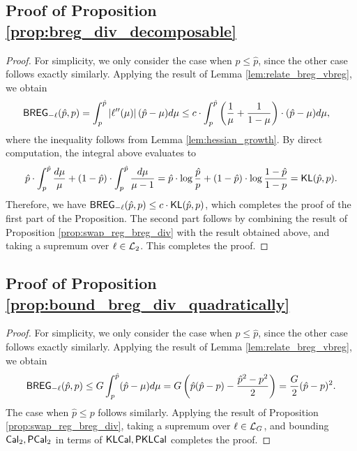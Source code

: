 \subsection{Proof of Proposition \ref{prop:breg_div_decomposable}}
\begin{proof}
    For simplicity, we only consider the case when $p \le \hat{p}$, since the other case follows exactly similarly. Applying the result of Lemma \ref{lem:relate_breg_vbreg}, we obtain \begin{align*}
        \mathsf{BREG}_{-\ell}(\hat{p}, p) &= \int_{p} ^ {\hat{p}} \left\lvert\ell''(\mu)\right\rvert (\hat{p} - \mu) d\mu \le c \cdot \int_{p} ^ {\hat{p}} \left( \frac{1}{\mu} + \frac{1}{1 - \mu} \right) \cdot (\hat{p} - \mu) d\mu,
    \end{align*}
    where the inequality follows from Lemma \ref{lem:hessian_growth}. By direct computation, the integral above evaluates to \begin{align*}
        \hat{p} \cdot \int_{p} ^ {\hat{p}} \frac{d\mu}{\mu} + (1 - \hat{p}) \cdot \int_{p} ^ {\hat{p}} \frac{d\mu}{\mu - 1} = \hat{p} \cdot \log \frac{\hat{p}}{p} + (1 - \hat{p}) \cdot \log \frac{1 - \hat{p}}{1 - p} = \mathsf{KL}(\hat{p}, p).
    \end{align*}
    Therefore, we have $\mathsf{BREG}_{-\ell}(\hat{p}, p) \le c \cdot \mathsf{KL}(\hat{p}, p)$, which completes the proof of the first part of the Proposition. The second part follows by combining the result of Proposition \ref{prop:swap_reg_breg_div} with the result obtained above, and taking a supremum over $\ell \in \mathcal{L}_{2}$. This completes the proof.
\end{proof}

\subsection{Proof of Proposition \ref{prop:bound_breg_div_quadratically}}

\begin{proof}
    For simplicity, we only consider the case when $p \le \hat{p}$, since the other case follows exactly similarly. Applying the result of Lemma \ref{lem:relate_breg_vbreg}, we obtain 
    $$\mathsf{BREG}_{-\ell}(\hat{p}, p) \le G \int_{p} ^ {\hat{p}} (\hat{p} - \mu) d\mu = G \left( \hat{p}(\hat{p} - p) - \frac{\hat{p} ^ {2} - p ^ {2}}{2} \right) = \frac{G}{2} (\hat{p} - p) ^ {2}.$$ 
            The case when $\hat{p} \le p$ follows similarly. Applying the result of Proposition \ref{prop:swap_reg_breg_div}, taking a supremum over $\ell \in \mathcal{L}_{G}$, and bounding $\mathsf{Cal}_{2}, \mathsf{PCal}_{2}$ in terms of $\mathsf{KLCal}, \mathsf{PKLCal}$ completes the proof.
\end{proof}
